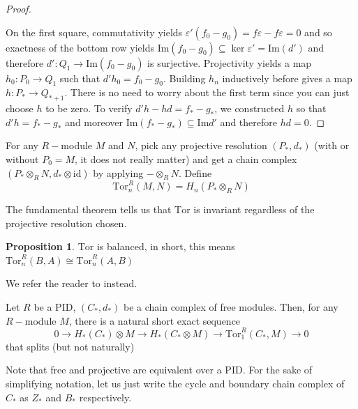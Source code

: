 \documentclass[12pt,reqno]{amsart}
\numberwithin{theorem}{section}
\theoremstyle{definition}
\theoremstyle{remark}
\numberwithin{equation}{section}
\renewcommand{\Im}{\text{Im}}
\theoremstyle{definition}
\newtheorem{prop}[theorem]{Proposition}
\newcommand{\id}{\mathrm{id}}
\newcommand{\Tor}{\mathrm{Tor}}
\begin{document}
\begin{proof}
\begin{center}
\end{center}
On the first square, commutativity yields $\varepsilon' (f_0-g_0)=f\varepsilon - f\varepsilon = 0$ and so exactness of the bottom row yields $\Im (f_0-g_0) \subseteq \ker \varepsilon' = \Im(d')$ and therefore $d':Q_1\rightarrow \Im (f_0-g_0)$ is surjective. Projectivity yields a map $h_0 : P_0 \rightarrow Q_1$ such that $d'h_0 = f_0-g_0$. Building $h_n$ inductively before gives a map $h:P_* \rightarrow Q_{*+1}$. There is no need to worry about the first term since you can just choose $h$ to be zero. To verify $d'h-hd = f_*-g_*$, we constructed $h$ so that $d'h = f_*-g_*$ and moreover $\Im (f_*-g_* )\subseteq \Im d'$ and therefore $hd = 0$.
\end{proof}
\begin{definition}
    For any $R-$module $M$ and $N$, pick any projective resolution $(P_*,d_*)$ (with or without $P_0=M$, it does not really matter) and get a chain complex $(P_*\otimes_R N,d_*\otimes \id)$ by applying $-\otimes_R N$. Define 
    $$\Tor^R_n(M,N) = H_n(P_*\otimes_R N)$$ 
\end{definition}
The fundamental theorem tells us that $\Tor$ is invariant regardless of the projective resolution chosen.
\begin{prop}
 $\Tor$ is balanced, in short, this means $\Tor^R_n(B,A)\cong \Tor_n^R(A,B)$ 
\end{prop}
We refer the reader to \cite{weibel} instead.
\begin{theorem}
    Let $R$ be a PID, $(C_*,d_*)$ be a chain complex of free modules. Then, for any $R-$module $M$, there is a natural short exact sequence
    $$0 \rightarrow H_*(C_*)\otimes M \rightarrow H_*(C_*\otimes M) \rightarrow \Tor_1^R(C_*,M)\rightarrow 0$$
    that splits (but not naturally)
\end{theorem}
Note that free and projective are equivalent over a PID. For the sake of simplifying notation, let us just write the cycle and boundary chain complex of $C_*$ as $Z_*$ and $B_*$ respectively.
\end{document}
